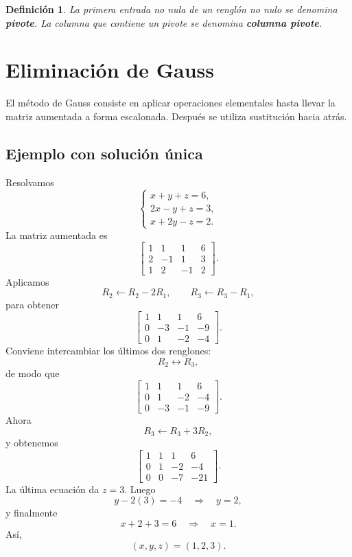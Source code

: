 \documentclass[12pt]{article}
\newtheorem{definicion}{Definición}[section]
\theoremstyle{remark}
\begin{document}
\begin{definicion}
La primera entrada no nula de un renglón no nulo se denomina \textbf{pivote}. La columna que contiene
un pivote se denomina \textbf{columna pivote}.
\end{definicion}
\section{Eliminación de Gauss}
El método de Gauss consiste en aplicar operaciones elementales hasta llevar la matriz aumentada a forma escalonada. Después se utiliza sustitución hacia atrás.

\subsection*{Ejemplo con solución única}

Resolvamos
\[
\begin{cases}
x+y+z=6,\\
2x-y+z=3,\\
x+2y-z=2.
\end{cases}
\]
La matriz aumentada es
\[
\left[
\begin{array}{ccc|c}
1&1&1&6\\
2&-1&1&3\\
1&2&-1&2
\end{array}
\right].
\]
Aplicamos
\[
R_2\leftarrow R_2-2R_1,\qquad
R_3\leftarrow R_3-R_1,
\]
para obtener
\[
\left[
\begin{array}{ccc|c}
1&1&1&6\\
0&-3&-1&-9\\
0&1&-2&-4
\end{array}
\right].
\]
Conviene intercambiar los últimos dos renglones:
\[
R_2\leftrightarrow R_3,
\]
de modo que
\[
\left[
\begin{array}{ccc|c}
1&1&1&6\\
0&1&-2&-4\\
0&-3&-1&-9
\end{array}
\right].
\]
Ahora
\[
R_3\leftarrow R_3+3R_2,
\]
y obtenemos
\[
\left[
\begin{array}{ccc|c}
1&1&1&6\\
0&1&-2&-4\\
0&0&-7&-21
\end{array}
\right].
\]
La última ecuación da $z=3$. Luego
\[
y-2(3)=-4\quad\Longrightarrow\quad y=2,
\]
y finalmente
\[
x+2+3=6\quad\Longrightarrow\quad x=1.
\]
Así,
\[
\boxed{(x,y,z)=(1,2,3)}.
\]
\end{document}
